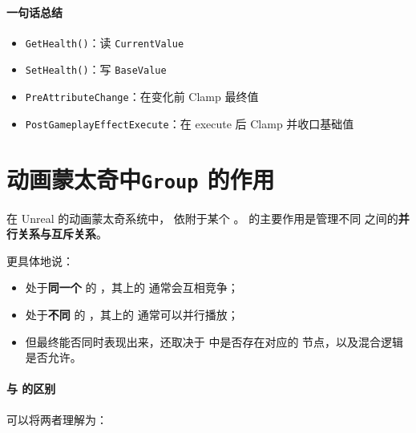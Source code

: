\paragraph{一句话总结}

\begin{itemize}
	\item \texttt{GetHealth()}：读 \texttt{CurrentValue}
	\item \texttt{SetHealth()}：写 \texttt{BaseValue}
	\item \texttt{PreAttributeChange}：在变化前 Clamp 最终值
	\item \texttt{PostGameplayEffectExecute}：在 execute 后 Clamp 并收口基础值
\end{itemize}

\section{动画蒙太奇中\texttt{Group} 的作用}
在 Unreal 的动画蒙太奇系统中， 依附于某个 。  
 的主要作用是管理不同  之间的\textbf{并行关系与互斥关系}。

更具体地说：

\begin{itemize}
	\item 处于\textbf{同一个}  的 ，其上的  通常会互相竞争；
	\item 处于\textbf{不同}  的 ，其上的  通常可以并行播放；
	\item 但最终能否同时表现出来，还取决于  中是否存在对应的  节点，以及混合逻辑是否允许。
\end{itemize}

\paragraph{ 与  的区别}
可以将两者理解为：

